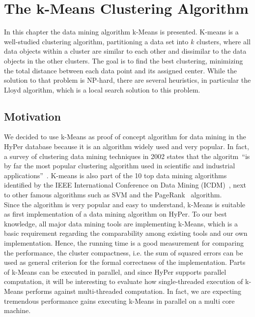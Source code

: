 \chapter{The k-Means Clustering Algorithm}\label{chapter:kmeans}

In this chapter the data mining algorithm k-Means is presented. K-means is a well-studied clustering algorithm, partitioning a data set into $k$ clusters, where all data objects within a cluster are similar to each other and dissimilar to the data objects in the other clusters. The goal is to find the best clustering, minimizing the total distance between each data point and its assigned center. While the solution to that problem is NP-hard, there are several heuristics, in particular the Lloyd algorithm, which is a local search solution to this problem.

\section{Motivation}
 
We decided to use k-Means as proof of concept algorithm for data mining in the HyPer database because it is an algorithm widely used and very popular. In fact, a survey of clustering data mining techniques in 2002 states that the algoritm~\enquote{is by far the most popular clustering algorithm used in scientific and industrial applications}~\parencite{berkhin2002survey}. K-means is also part of the 10 top data mining algorithms identified by the IEEE International Conference on Data Mining (ICDM)~\parencite{top10}, next to other famous algorithms such as SVM and the PageRank~\parencite{pagerank} algorithm. 
\\
Since the algorithm is very popular and easy to understand, k-Means is suitable as first implementation of a data mining algorithm on HyPer. To our best knowledge, all major data mining tools are implementing k-Means, which is a basic requirement regarding the comparability among existing tools and our own implementation. Hence, the running time is a good measurement for comparing the performance, the cluster compactness, i.e. the sum of squared errors can be used as general criterion for the formal correctness of the implementation. 
Parts of k-Means can be executed in parallel, and since HyPer supports parallel computation, it will be interesting to evaluate how single-threaded execution of k-Means performs against multi-threaded computation. In fact, we are expecting tremendous performance gains executing k-Means in parallel on a multi core machine.

